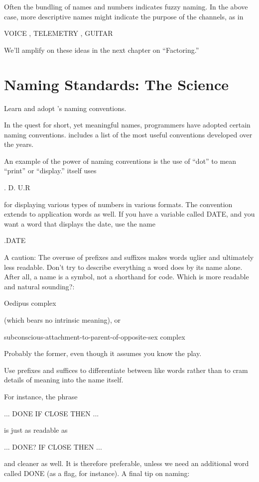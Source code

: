 Often the bundling of names and numbers indicates fuzzy naming.
In the above case, more descriptive names might indicate the purpose of
the channels, as in
\begin{Code}
VOICE , TELEMETRY , GUITAR
\end{Code}
We'll amplify on these ideas in the next chapter on ``Factoring.''

\section{Naming Standards: The Science}

\begin{tip}
Learn and adopt \Forth{}'s naming conventions.
\end{tip}
In the quest for short, yet meaningful names, \Forth{} programmers
have adopted certain naming conventions.   includes a list of
the most useful conventions developed over the years.

An example of the power of naming conventions is the use of ``dot''
to mean ``print'' or ``display.'' \Forth{} itself uses
\begin{Code}
.  D.  U.R
\end{Code}
for displaying various types of numbers in various formats.  The convention
extends to application words as well.  If you have a variable called
DATE, and you want a word that displays the date, use the name
\begin{Code}
.DATE
\end{Code}
A caution: The overuse of prefixes and suffixes makes words uglier and
ultimately less readable.  Don't try to describe everything a word does by
its name alone.  After all, a name is a symbol, not a shorthand for code.
Which is more readable and natural sounding?:
\begin{tfquot}
Oedipus complex
\end{tfquot}
(which bears no intrinsic meaning), or
\begin{tfquot}
subconscious-attachment-to-parent-of-opposite-sex complex
\end{tfquot}
Probably the former, even though it assumes you know the play.

\begin{tip}
Use prefixes and suffices to differentiate between like words rather than to
cram details of meaning into the name itself.
\end{tip}
For instance, the phrase
\begin{Code}
... DONE IF CLOSE THEN ...
\end{Code}
is just as readable as
\begin{Code}
... DONE? IF CLOSE THEN ...
\end{Code}
and cleaner as well.  It is therefore preferable, unless we need an additional
word called DONE (as a flag, for instance).
A final tip on naming:

